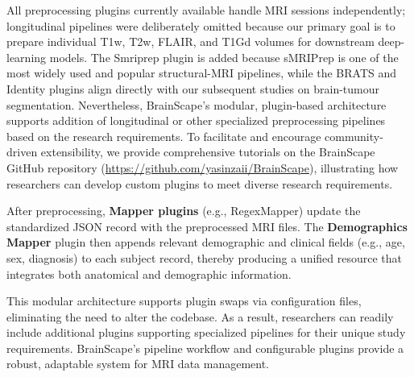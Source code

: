 All preprocessing plugins currently available handle MRI sessions independently; 
longitudinal pipelines were deliberately omitted because our primary goal is to prepare 
individual T1w, T2w, FLAIR, and T1Gd volumes for downstream deep-learning models.
The Smriprep plugin is added because sMRIPrep is one of the most widely used and 
popular structural-MRI pipelines, 
while the BRATS and Identity plugins align directly with our subsequent studies on brain-tumour segmentation.
Nevertheless, BrainScape's modular, plugin-based architecture supports addition of longitudinal or 
other specialized preprocessing pipelines based on the research requirements. 
To facilitate and encourage community-driven extensibility, we provide comprehensive tutorials 
on the BrainScape GitHub repository (\url{https://github.com/yasinzaii/BrainScape}), 
illustrating how researchers can develop custom plugins to meet diverse research requirements.

After preprocessing, \textbf{Mapper plugins} (e.g., RegexMapper) update the standardized JSON record 
with the preprocessed MRI files. The \textbf{Demographics Mapper} plugin then appends relevant demographic 
and clinical fields (e.g., age, sex, diagnosis) to each subject record, thereby producing a unified 
resource that integrates both anatomical and demographic information.

This modular architecture supports plugin swaps via configuration files, 
eliminating the need to alter the codebase. As a result, researchers can 
readily include additional plugins supporting specialized pipelines for their unique study requirements. 
BrainScape's pipeline workflow and configurable plugins provide a robust, adaptable system for MRI data management.


